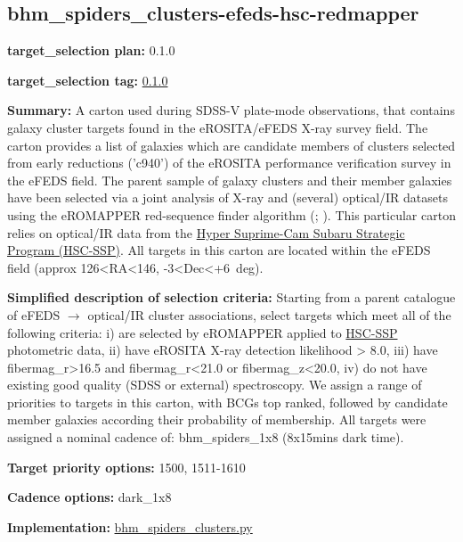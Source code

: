 \hypertarget{bhm_spiders_clusters-efeds-hsc-redmapper_plan0.1.0}{%
\subsection{bhm\_spiders\_clusters-efeds-hsc-redmapper}\label{bhm_spiders_clusters-efeds-hsc-redmapper_plan0.1.0}}

\noindent\textbf{target\_selection plan:} 0.1.0

\noindent\textbf{target\_selection tag:}
\href{https://github.com/sdss/target_selection/tree/0.1.0/}{0.1.0}

\noindent\textbf{Summary:} A carton used during SDSS-V plate-mode observations,
that contains galaxy cluster targets found in the eROSITA/eFEDS X-ray
survey field. The carton provides a list of galaxies which are candidate
members of clusters selected from early reductions ('c940') of the
eROSITA performance verification survey in the eFEDS field. The parent
sample of galaxy clusters and their member galaxies have been selected
via a joint analysis of X-ray and (several) optical/IR datasets using
the eROMAPPER red-sequence finder algorithm
(\citealt{Rykoff2014};
\citealt{IderChitham2020}). This particular carton relies on optical/IR data
from the \href{https://hsc.mtk.nao.ac.jp/ssp/}{Hyper Suprime-Cam Subaru
Strategic Program (HSC-SSP)}. All targets in this carton are located
within the eFEDS field (approx 126\textless{}RA\textless{}146,
-3\textless{}Dec\textless{}+6~deg).

\noindent\textbf{Simplified description of selection criteria:} Starting from a
parent catalogue of eFEDS $\rightarrow$ optical/IR cluster associations, select
targets which meet all of the following criteria: i) are selected by
eROMAPPER applied to \href{https://hsc.mtk.nao.ac.jp/ssp/}{HSC-SSP}
photometric data, ii) have eROSITA X-ray detection likelihood
\textgreater{} 8.0, iii) have fibermag\_r\textgreater{}16.5 and
fibermag\_r\textless{}21.0 or fibermag\_z\textless{}20.0, iv) do not
have existing good quality (SDSS or external) spectroscopy. We assign a
range of priorities to targets in this carton, with BCGs top ranked,
followed by candidate member galaxies according their probability of
membership. All targets were assigned a nominal cadence of:
bhm\_spiders\_1x8 (8x15mins dark time).


\noindent\textbf{Target priority options:} 1500, 1511-1610

\noindent\textbf{Cadence options:} dark\_1x8

\noindent\textbf{Implementation:}
\href{https://github.com/sdss/target_selection/blob/0.1.0/python/target_selection/cartons/bhm_spiders_clusters.py}{bhm\_spiders\_clusters.py}

